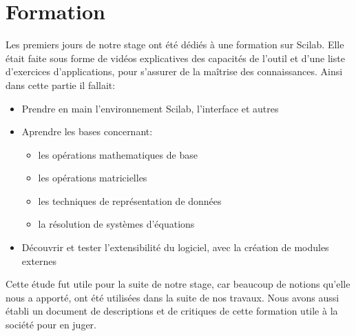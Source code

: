 \section*{Formation}

Les premiers jours de notre stage ont été d\'edi\'es \`a une
formation sur Scilab.
Elle était faite sous forme de vidéos explicatives des capacités de l'outil et
d'une liste d'exercices d'applications, pour s'assurer de la
ma\^itrise des connaissances.
Ainsi dans cette partie il fallait:

\begin{itemize}
\item Prendre en main l'environnement Scilab, l'interface et autres
\item Aprendre les bases concernant:
    \begin{itemize}
        \item les opérations mathematiques de base
        \item les opérations matricielles
        \item les techniques de repr\'esentation de données
        \item la r\'esolution de syst\`emes d'\'equations
    \end{itemize}
\item Découvrir et tester l'extensibilité du logiciel,
    avec la création de modules externes
\end{itemize}

Cette étude fut utile pour la suite de notre stage,
car beaucoup de notions qu'elle nous a apporté,
ont été utilisées dans la suite de nos travaux.
Nous avons aussi établi un document de descriptions et de critiques
de cette formation utile à la société pour en juger.

